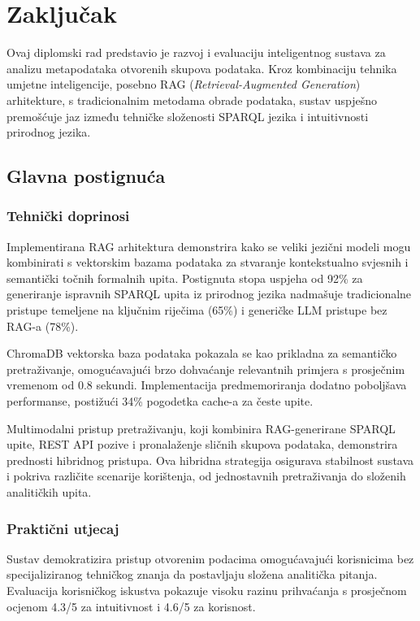 \chapter{Zaključak}
\label{ch:conclusion}


Ovaj diplomski rad predstavio je razvoj i evaluaciju inteligentnog sustava za analizu metapodataka otvorenih skupova podataka. Kroz kombinaciju tehnika umjetne inteligencije, posebno RAG (\textit{Retrieval-Augmented Generation}) arhitekture, s tradicionalnim metodama obrade podataka, sustav uspješno premošćuje jaz između tehničke složenosti SPARQL jezika i intuitivnosti prirodnog jezika.

\section{Glavna postignuća}

\subsection{Tehnički doprinosi}

Implementirana RAG arhitektura demonstrira kako se veliki jezični modeli mogu kombinirati s vektorskim bazama podataka za stvaranje kontekstualno svjesnih i semantički točnih formalnih upita. Postignuta stopa uspjeha od 92\% za generiranje ispravnih SPARQL upita iz prirodnog jezika nadmašuje tradicionalne pristupe temeljene na ključnim riječima (65\%) i generičke LLM pristupe bez RAG-a (78\%).

ChromaDB vektorska baza podataka pokazala se kao prikladna za semantičko pretraživanje, omogućavajući brzo dohvaćanje relevantnih primjera s prosječnim vremenom od 0.8 sekundi. Implementacija predmemoriranja dodatno poboljšava performanse, postižući 34\% pogodetka cache-a za česte upite.

Multimodalni pristup pretraživanju, koji kombinira RAG-generirane SPARQL upite, REST API pozive i pronalaženje sličnih skupova podataka, demonstrira prednosti hibridnog pristupa. Ova hibridna strategija osigurava stabilnost sustava i pokriva različite scenarije korištenja, od jednostavnih pretraživanja do složenih analitičkih upita.

\subsection{Praktični utjecaj}

Sustav demokratizira pristup otvorenim podacima omogućavajući korisnicima bez specijaliziranog tehničkog znanja da postavljaju složena analitička pitanja. Evaluacija korisničkog iskustva pokazuje visoku razinu prihvaćanja s prosječnom ocjenom 4.3/5 za intuitivnost i 4.6/5 za korisnost.

